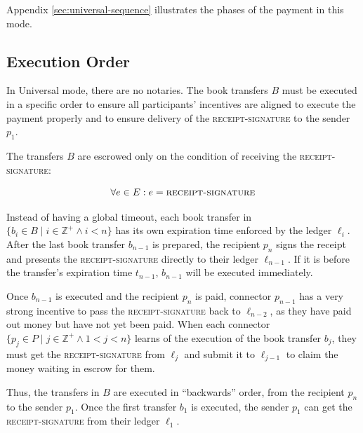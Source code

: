 \documentclass[letterpaper,twocolumn,10pt]{article}
\begin{document}
Appendix \ref{sec:universal-sequence} illustrates the phases of the payment in this mode.


\subsection{Execution Order}


In Universal mode, there are no notaries. The book transfers $B$ must be executed in a specific order to ensure all participants' incentives are aligned to execute the payment properly and to ensure delivery of the \textsc{receipt-signature} to the sender $p_1$.

The transfers $B$ are escrowed only on the condition of receiving the \textsc{receipt-signature}:

\begin{equation}
\forall e \in E : e = \textsc{receipt-signature}
\end{equation}

Instead of having a global timeout, each book transfer in $ \{ b_i \in B \mid i \in \mathbb{Z}^+ \land i < n \} $ has its own expiration time enforced by the ledger $\ell_i$. 
After the last book transfer $b_{n-1}$ is prepared, the recipient $p_n$ signs the receipt and presents the \textsc{receipt-signature} directly to their ledger $\ell_{n-1}$. If it is before the transfer's expiration time $t_{n-1}$, $b_{n-1}$ will be executed immediately.

Once $b_{n-1}$ is executed and the recipient $p_n$ is paid, connector $p_{n-1}$ has a very strong incentive to pass the \textsc{receipt-signature} back to $\ell_{n-2}$, as they have paid out money but have not yet been paid. When each connector $ \{ p_j \in P \mid j \in \mathbb{Z}^+ \land 1 < j < n \} $ learns of the execution of the book transfer $b_j$, they must get the \textsc{receipt-signature} from $\ell_j$ and submit it to $\ell_{j-1}$ to claim the money waiting in escrow for them. 

Thus, the transfers in $B$ are executed in ``backwards'' order, from the recipient $p_n$ to the sender $p_1$. Once the first transfer $b_1$ is executed, the sender $p_1$ can get the \textsc{receipt-signature} from their ledger $\ell_1$.
\end{document}
